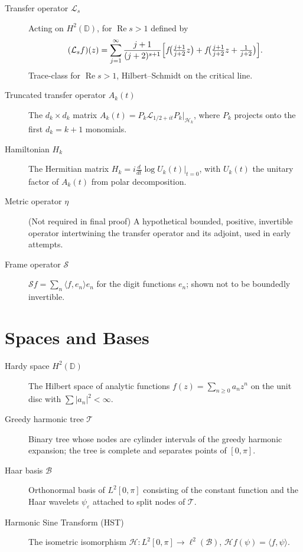 \documentclass[11pt,a4paper]{article}
\begin{document}
\begin{description}
\item[Transfer operator \(\mathcal{L}_s\)] Acting on \(H^2(\mathbb{D})\), for \(\operatorname{Re}s>1\) defined by \[(\mathcal{L}_s f)(z) = \sum_{j=1}^\infty \frac{j+1}{(j+2)^{s+1}}\Bigl[f\!\bigl(\tfrac{j+1}{j+2}z\bigr) + f\!\bigl(\tfrac{j+1}{j+2}z + \tfrac{1}{j+2}\bigr)\Bigr].\] Trace‑class for \(\operatorname{Re}s>1\), Hilbert–Schmidt on the critical line. \cite{HSTpaper,TraceClass}
\item[Truncated transfer operator \(A_k(t)\)] The \(d_k\times d_k\) matrix \(A_k(t) = P_k\mathcal{L}_{1/2+it}P_k|_{\mathcal{H}_k}\), where \(P_k\) projects onto the first \(d_k = k+1\) monomials. \cite{RHproof}
\item[Hamiltonian \(H_k\)] The Hermitian matrix \(H_k = i\frac{d}{dt}\log U_k(t)|_{t=0}\), with \(U_k(t)\) the unitary factor of \(A_k(t)\) from polar decomposition. \cite{RHproof}
\item[Metric operator \(\eta\)] (Not required in final proof) A hypothetical bounded, positive, invertible operator intertwining the transfer operator and its adjoint, used in early attempts. \cite{SpectralProgramme}
\item[Frame operator \(\mathcal{S}\)] \(\mathcal{S}f = \sum_n \langle f,e_n\rangle e_n\) for the digit functions \(e_n\); shown not to be boundedly invertible. \cite{ResearchGuide}
\end{description}

\section*{Spaces and Bases}

\begin{description}
\item[Hardy space \(H^2(\mathbb{D})\)] The Hilbert space of analytic functions \(f(z)=\sum_{n\ge0}a_n z^n\) on the unit disc with \(\sum|a_n|^2<\infty\). \cite{HSTpaper}
\item[Greedy harmonic tree \(\mathcal{T}\)] Binary tree whose nodes are cylinder intervals of the greedy harmonic expansion; the tree is complete and separates points of \([0,\pi]\). \cite{HSTpaper}
\item[Haar basis \(\mathcal{B}\)] Orthonormal basis of \(L^2[0,\pi]\) consisting of the constant function and the Haar wavelets \(\psi_\varepsilon\) attached to split nodes of \(\mathcal{T}\). \cite{HSTpaper}
\item[Harmonic Sine Transform (HST)] The isometric isomorphism \(\mathcal{H}: L^2[0,\pi] \to \ell^2(\mathcal{B})\), \(\mathcal{H}f(\psi) = \langle f,\psi\rangle\). \cite{HSTpaper}
\end{description}
\end{document}
